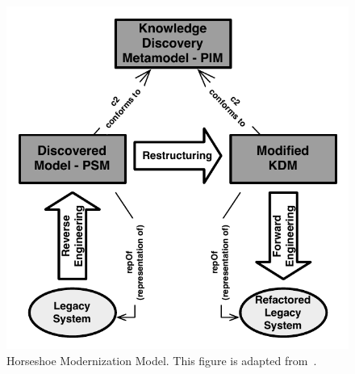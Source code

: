 


\begin{figure}[!ht]
\centering
 \includegraphics[scale=0.55]{figuras/horseshoes}
\caption{Horseshoe Modernization Model. This figure is adapted from~\cite{OMG_ADM}.}
\label{fig:ADM_shorseshoe}
\end{figure}

